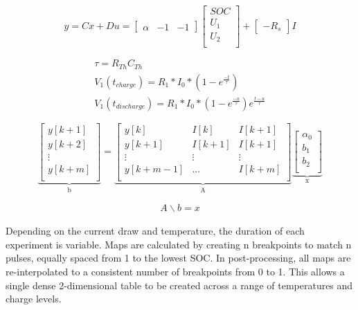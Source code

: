 \documentclass[]{aiaa-tc}%
\begin{document}
\[
y = Cx + Du = 
\begin{bmatrix}
    \alpha & -1 & -1
\end{bmatrix}
\begin{bmatrix}
    SOC \\
    U_{1} \\
    U_{2} \\
\end{bmatrix}
+
\begin{bmatrix}
    -R_{s}
\end{bmatrix}
I
\]


\begin{align}
    \tau = R_{Th}C_{Th} \\
    V_{1}(t_{charge}) = R_{1}*I_{0}*(1-e^{\frac{-t}{\tau}})\\
    V_{1}(t_{discharge}) = R_{1}*I_{0}*(1-e^{\frac{-a}{\tau}})e^{\frac{t-a}{\tau}}
\end{align}


\[
\underbrace{
\begin{bmatrix}
    y[k+1] \\
    y[k+2] \\ 
    \vdots \\
    y[k+m] \\
\end{bmatrix}
}_{\text{b}}
=
\underbrace{
\begin{bmatrix}
    y[k] & I[k] & I[k+1] \\
    y[k+1] & I[k+1] & I[k+1] \\
    \vdots  & \vdots  & \vdots \\
    y[k+m-1] & ... & I[k+m] \\
\end{bmatrix}
}_{\text{A}}
\underbrace{
\begin{bmatrix}
    \alpha_{0} \\
    b_{1} \\
    b_{2} \\
\end{bmatrix}
}_{\text{x}}
\]

\begin{align}
    A\backslash b = x
\end{align}



Depending on the current draw and temperature, the duration of each experiment is variable. Maps are calculated by creating n breakpoints to match n pulses, equally spaced from 1 to the lowest SOC. In post-processing, all maps are re-interpolated to a consistent number of breakpoints from 0 to 1. This allows a single dense 2-dimensional table to be created across a range of temperatures and charge levels.
\end{document}
